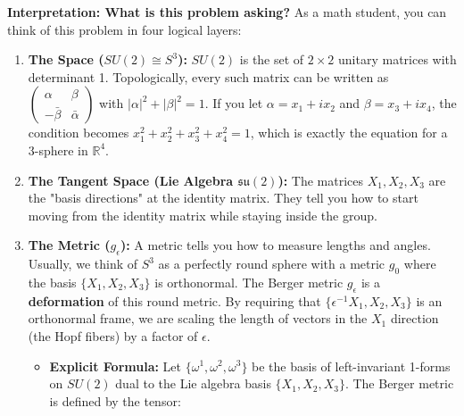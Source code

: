\begin{solution}
\textbf{Interpretation: What is this problem asking?}
As a math student, you can think of this problem in four logical layers:
\begin{enumerate}
    \item \textbf{The Space ($SU(2) \cong S^3$):} $SU(2)$ is the set of $2 \times 2$ unitary matrices with determinant 1. Topologically, every such matrix can be written as $\begin{pmatrix} \alpha & \beta \\ -\bar{\beta} & \bar{\alpha} \end{pmatrix}$ with $|\alpha|^2 + |\beta|^2 = 1$. If you let $\alpha = x_1 + ix_2$ and $\beta = x_3 + ix_4$, the condition becomes $x_1^2 + x_2^2 + x_3^2 + x_4^2 = 1$, which is exactly the equation for a 3-sphere in $\mathbb{R}^4$.
    \item \textbf{The Tangent Space (Lie Algebra $\mathfrak{su}(2)$):} The matrices $X_1, X_2, X_3$ are the "basis directions" at the identity matrix. They tell you how to start moving from the identity matrix while staying inside the group.
    \item \textbf{The Metric ($g_\epsilon$):} A metric tells you how to measure lengths and angles. Usually, we think of $S^3$ as a perfectly round sphere with a metric $g_0$ where the basis $\{X_1, X_2, X_3\}$ is orthonormal. The Berger metric $g_\epsilon$ is a \textbf{deformation} of this round metric. By requiring that $\{\epsilon^{-1}X_1, X_2, X_3\}$ is an orthonormal frame, we are scaling the length of vectors in the $X_1$ direction (the Hopf fibers) by a factor of $\epsilon$.
    \begin{itemize}
        \item \textbf{Explicit Formula:} Let $\{\omega^1, \omega^2, \omega^3\}$ be the basis of left-invariant 1-forms on $SU(2)$ dual to the Lie algebra basis $\{X_1, X_2, X_3\}$. The Berger metric is defined by the tensor:

\end{itemize}
\end{enumerate}
\end{solution}
